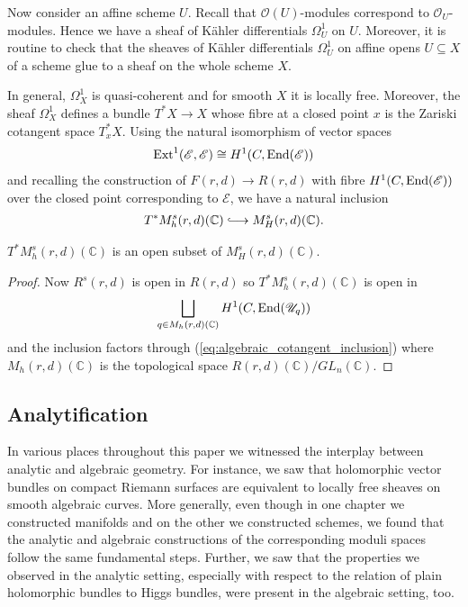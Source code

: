\documentclass[12pt]{ociamthesis}  %
\begin{document}
Now consider an affine scheme $U$. Recall that $\mathscr O(U)$-modules
correspond to $\mathscr O_U$-modules. Hence we have a sheaf of K\"ahler
differentials $\Omega^1_U$ on $U$. Moreover, it is routine to check that the
sheaves of K\"ahler differentials $\Omega^1_U$ on affine opens
$U\subseteq X$ of a scheme glue to a sheaf on the whole scheme $X$.

In general, $\Omega^1_X$ is quasi-coherent and for smooth $X$ it is
locally free. \cite[\href{https://stacks.math.columbia.edu/tag/02G1}{Tag 02G1}]{stacks-project}
Moreover, the sheaf $\Omega^1_X$ defines a bundle $T^*X\to X$
whose fibre at a closed point $x$ is the Zariski cotangent space
$T^*_x X$. \cite[\href{https://stacks.math.columbia.edu/tag/0B2D}{Tag 0B2D}]{stacks-project}
Using the natural isomorphism of vector spaces
\begin{align*}
  \operatorname{Ext}^1(\mathscr E,\mathscr E) \cong H^1(C,\operatorname{End}(\mathscr E))
\end{align*}
and recalling the construction of $F(r,d)\to R(r,d)$ with
fibre $H^1(C,\operatorname{End}(\mathscr E))$ over the closed point corresponding
to $\mathscr E$, we have a natural inclusion
\begin{align}\label{eq:algebraic_cotangent_inclusion}
  T^*M^s_h(r,d)(\mathbb C) \longinc M^s_H(r,d)(\mathbb C).
\end{align}

\begin{corollary}\label{thm:cotangent_is_open}
  $T^*M^s_h(r,d)(\mathbb C)$ is an open subset of $M^s_H(r,d)(\mathbb C)$.
  \begin{proof}
    Now $R^s(r,d)$ is open in $R(r,d)$ so
    $T^*M^s_h(r,d)(\mathbb C)$ is open in
    \begin{align*}
      \bigsqcup_{q\in M_h(r,d)(\mathbb C)} H^1(C,\operatorname{End}(\mathscr U_q))
    \end{align*}
    and the inclusion factors through (\ref{eq:algebraic_cotangent_inclusion})
    where $M_h(r,d)(\mathbb C)$ is the topological space
    $R(r,d)(\mathbb C)/GL_n(\mathbb C)$.
  \end{proof}
\end{corollary}


\subsection{Analytification}

In various places throughout this paper we witnessed the interplay
between analytic and algebraic geometry. For instance, we saw that
holomorphic vector bundles on compact Riemann surfaces are equivalent
to locally free sheaves on smooth algebraic curves. More generally,
even though in one chapter we constructed manifolds and on the other
we constructed schemes, we found that the analytic and algebraic
constructions of the corresponding moduli spaces follow the same
fundamental steps. Further, we saw that the properties we observed
in the analytic setting, especially with respect to the relation
of plain holomorphic bundles to Higgs bundles, were present in the
algebraic setting, too.
\end{document}
